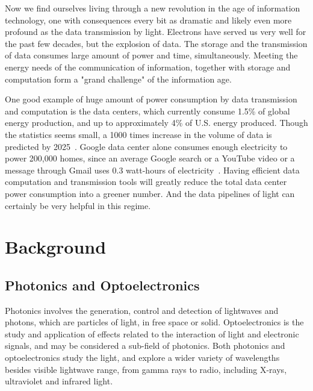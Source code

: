 Now we find ourselves living through a new revolution in the age of information
technology, one with consequences every bit as dramatic and likely even more
profound as the data transmission by light. Electrons have served us very well
for the past few decades, but the explosion of data. The storage and the
transmission of data consumes large amount of power and time, simultaneously.
Meeting the energy needs of the communication of information, together with
storage and computation form a "grand challenge" of the information age.

One good example of huge amount of power consumption by data transmission and
computation is the data centers, which currently consume 1.5\% of global energy
production, and up to approximately 4\% of U.S. energy produced. Though the
statistics seems small, a 1000 times increase in the volume of data is
predicted by 2025~\cite{Hilbert:2011tg}. Google data center alone consumes
enough electricity to power 200,000 homes, since an average Google search or a
YouTube video or a message through Gmail uses 0.3 watt-hours of
electricity~\cite{glanz2011google}. Having efficient data computation and
transmission tools will greatly reduce the total data center power consumption
into a greener number. And the data pipelines of light can certainly be very
helpful in this regime.

\section{Background} \label{sec:intro_BG}

\subsection{Photonics and Optoelectronics}

Photonics involves the generation, control and detection of lightwaves and
photons, which are particles of light, in free space or solid.
Optoelectronics is the study and application of effects related to the
interaction of light and electronic signals, and may be considered a sub-field
of photonics. Both photonics and optoelectronics study the light, and explore a
wider variety of wavelengths besides visible lightwave range, from gamma rays
to radio, including X-rays, ultraviolet and infrared light.

